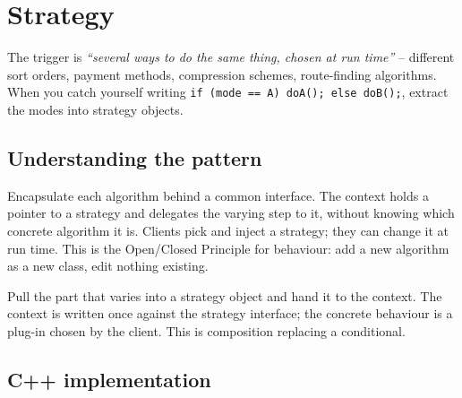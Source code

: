 \section{Strategy}
\label{sec:pat-strategy}


\begin{patternbox}
The trigger is \emph{``several ways to do the same thing, chosen at run
time''} -- different sort orders, payment methods, compression schemes,
route-finding algorithms. When you catch yourself writing \texttt{if
(mode == A) doA(); else doB();}, extract the modes into strategy objects.
\end{patternbox}

\subsection*{Understanding the pattern}

Encapsulate each algorithm behind a common interface. The context holds a
pointer to a strategy and delegates the varying step to it, without knowing
which concrete algorithm it is. Clients pick and inject a strategy; they
can change it at run time. This is the Open/Closed Principle for
behaviour: add a new algorithm as a new class, edit nothing existing.

\begin{ideabox}
Pull the part that varies into a strategy object and hand it to the
context. The context is written once against the strategy interface; the
concrete behaviour is a plug-in chosen by the client. This is composition
replacing a conditional.
\end{ideabox}

\subsection*{C++ implementation}

